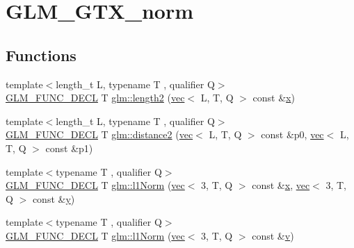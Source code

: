 \hypertarget{group__gtx__norm}{}\section{G\+L\+M\+\_\+\+G\+T\+X\+\_\+norm}
\label{group__gtx__norm}
\subsection*{Functions}
\begin{DoxyCompactItemize}
\item 
{\footnotesize template$<$length\+\_\+t L, typename T , qualifier Q$>$ }\\\mbox{\hyperlink{setup_8hpp_ab2d052de21a70539923e9bcbf6e83a51}{G\+L\+M\+\_\+\+F\+U\+N\+C\+\_\+\+D\+E\+CL}} T \mbox{\hyperlink{group__gtx__norm_ga8d1789651050adb7024917984b41c3de}{glm\+::length2}} (\mbox{\hyperlink{structglm_1_1vec}{vec}}$<$ L, T, Q $>$ const \&\mbox{\hyperlink{_s_d_l__opengl_8h_ad0e63d0edcdbd3d79554076bf309fd47}{x}})
\item 
{\footnotesize template$<$length\+\_\+t L, typename T , qualifier Q$>$ }\\\mbox{\hyperlink{setup_8hpp_ab2d052de21a70539923e9bcbf6e83a51}{G\+L\+M\+\_\+\+F\+U\+N\+C\+\_\+\+D\+E\+CL}} T \mbox{\hyperlink{group__gtx__norm_ga85660f1b79f66c09c7b5a6f80e68c89f}{glm\+::distance2}} (\mbox{\hyperlink{structglm_1_1vec}{vec}}$<$ L, T, Q $>$ const \&p0, \mbox{\hyperlink{structglm_1_1vec}{vec}}$<$ L, T, Q $>$ const \&p1)
\item 
{\footnotesize template$<$typename T , qualifier Q$>$ }\\\mbox{\hyperlink{setup_8hpp_ab2d052de21a70539923e9bcbf6e83a51}{G\+L\+M\+\_\+\+F\+U\+N\+C\+\_\+\+D\+E\+CL}} T \mbox{\hyperlink{group__gtx__norm_gae2fc0b2aa967bebfd6a244700bff6997}{glm\+::l1\+Norm}} (\mbox{\hyperlink{structglm_1_1vec}{vec}}$<$ 3, T, Q $>$ const \&\mbox{\hyperlink{_s_d_l__opengl_8h_ad0e63d0edcdbd3d79554076bf309fd47}{x}}, \mbox{\hyperlink{structglm_1_1vec}{vec}}$<$ 3, T, Q $>$ const \&\mbox{\hyperlink{_s_d_l__opengl_8h_a1675d9d7bb68e1657ff028643b4037e3}{y}})
\item 
{\footnotesize template$<$typename T , qualifier Q$>$ }\\\mbox{\hyperlink{setup_8hpp_ab2d052de21a70539923e9bcbf6e83a51}{G\+L\+M\+\_\+\+F\+U\+N\+C\+\_\+\+D\+E\+CL}} T \mbox{\hyperlink{group__gtx__norm_ga1a7491e2037ceeb37f83ce41addfc0be}{glm\+::l1\+Norm}} (\mbox{\hyperlink{structglm_1_1vec}{vec}}$<$ 3, T, Q $>$ const \&\mbox{\hyperlink{_s_d_l__opengl_8h_a10a82eabcb59d2fcd74acee063775f90}{v}})

\end{DoxyCompactItemize}
